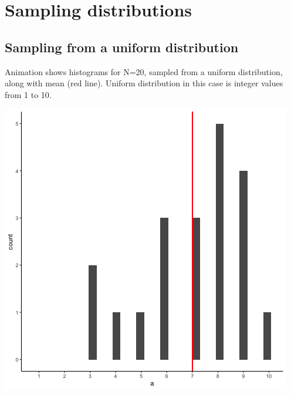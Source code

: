 \documentclass[
]{book}
\begin{document}
\hypertarget{sampling-distributions}{%
\section{Sampling distributions}\label{sampling-distributions}}

\hypertarget{sampling-from-a-uniform-distribution}{%
\subsection{Sampling from a uniform distribution}\label{sampling-from-a-uniform-distribution}}

Animation shows histograms for N=20, sampled from a uniform distribution, along with mean (red line). Uniform distribution in this case is integer values from 1 to 10.

\includegraphics{gifs/sampleHistUnif-1.gif}
\end{document}
